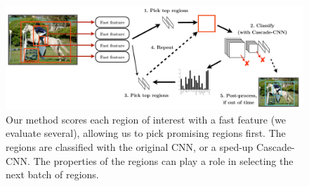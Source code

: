 \begin{figure}[ht]
\begin{center}
\includegraphics[width=0.98\columnwidth]{../ccnn/figures/combined.pdf}
\caption{
Our method scores each region of interest with a fast feature (we evaluate several), allowing us to pick promising regions first.
The regions are classified with the original CNN, or a sped-up Cascade-CNN.
The properties of the regions can play a role in selecting the next batch of regions.
}\label{fig:combined}
\end{center}
\end{figure}

